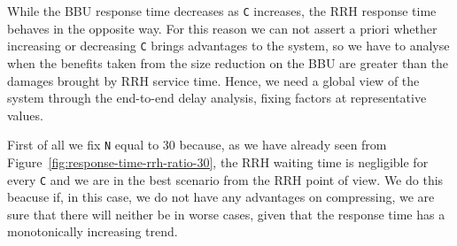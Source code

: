 \documentclass[11pt,a4paper,oneside, openright]{article}
\begin{document}
While the BBU response time decreases as \texttt{C} increases, the RRH response time behaves in the opposite way. For this reason we can not assert a priori whether increasing or decreasing \texttt{C} brings advantages to the system, so we have to analyse when the benefits taken from the size reduction on the BBU are greater than the damages brought by RRH service time. Hence, we need a global view of the system through the end-to-end delay analysis, fixing factors at representative values.




First of all we fix \texttt{N} equal to 30 because, as we have already seen from Figure~\ref{fig:response-time-rrh-ratio-30}, the RRH waiting time is negligible for every \texttt{C} and we are in the best scenario from the RRH point of view. We do this beacuse if, in this case, we do not have any advantages on compressing, we are sure that there will neither be in worse cases, given that the response time has a monotonically increasing trend.
\end{document}
